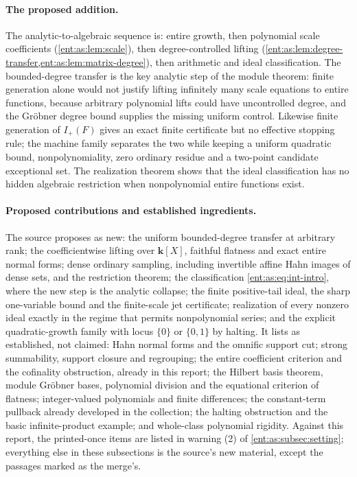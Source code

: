 \documentclass[11pt]{article}
\theoremstyle{plain}
\theoremstyle{plain}
\theoremstyle{plain}
\theoremstyle{definition}
\theoremstyle{definition}
\theoremstyle{definition}
\theoremstyle{definition}
\theoremstyle{remark}
\newcommand{\kk}{\mathbf k}\newcommand{\PP}{\mathbb P}
\begin{document}
\paragraph{The proposed addition.} The analytic-to-algebraic sequence is:
entire growth, then polynomial scale coefficients
(\cref{ent:as:lem:scale}), then degree-controlled lifting
(\cref{ent:as:lem:degree-transfer,ent:as:lem:matrix-degree}), then arithmetic
and ideal classification. The bounded-degree transfer is the key analytic step
of the module theorem: finite generation alone would not justify lifting
infinitely many scale equations to entire functions, because arbitrary
polynomial lifts could have uncontrolled degree, and the Gr\"obner degree bound
supplies the missing uniform control. Likewise finite generation of $I_+(F)$
gives an exact finite certificate but no effective stopping rule; the machine
family separates the two while keeping a uniform quadratic bound,
nonpolynomiality, zero ordinary residue and a two-point candidate exceptional
set. The realization theorem shows that the ideal classification has no
hidden algebraic restriction when nonpolynomial entire functions exist.

\paragraph{Proposed contributions and established ingredients.} The source
proposes as new: the uniform bounded-degree transfer at arbitrary rank; the
coefficientwise lifting over $\kk[X]$, faithful flatness and exact entire
normal forms; dense ordinary sampling, including invertible affine Hahn images
of dense sets, and the restriction theorem; the classification
\eqref{ent:as:eq:int-intro}, where the new step is the analytic collapse; the
finite positive-tail ideal, the sharp one-variable bound and the finite-scale
jet certificate; realization of every nonzero ideal exactly in the regime that
permits nonpolynomial series; and the explicit quadratic-growth family with
locus $\{0\}$ or $\{0,1\}$ by halting. It lists as established, not claimed:
Hahn normal forms and the omnific support cut; strong summability, support
closure and regrouping; the entire coefficient criterion and the cofinality
obstruction, already in this report; the Hilbert basis theorem, module
Gr\"obner bases, polynomial division and the equational criterion of flatness;
integer-valued polynomials and finite differences; the constant-term pullback
already developed in the collection; the halting obstruction and the basic
infinite-product example; and whole-class polynomial rigidity. Against this
report, the printed-once items are listed in warning (2) of
\cref{ent:as:subsec:setting}; everything else in these subsections is the
source's new material, except the passages marked as the merge's.
\end{document}
